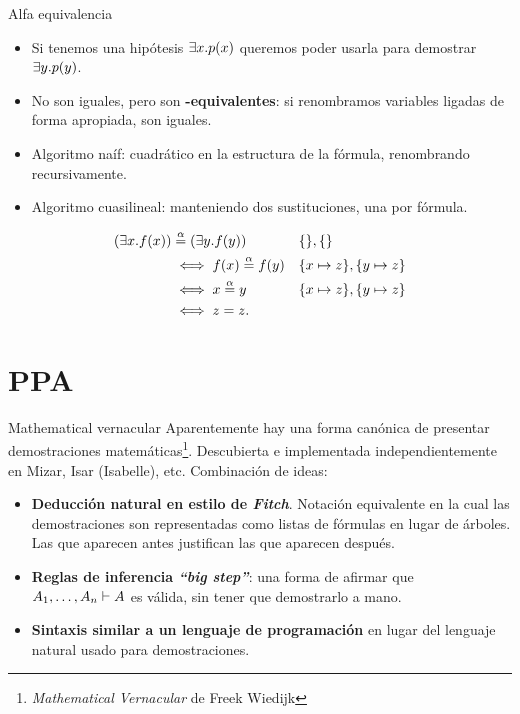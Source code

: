 \documentclass[xcolor={dvipsnames},spanish]{beamer}
\begin{document}
\begin{frame}{Alfa equivalencia}
    \begin{itemize}    
        \item Si tenemos una hipótesis $\exists x . p(x)$ queremos poder
        usarla para demostrar $\exists y . p(y)$.
        \item No son iguales, pero son \textbf{\bm{$\alpha$}-equivalentes}: si
        renombramos variables ligadas de forma apropiada, son iguales.
        \item Algoritmo naíf: cuadrático en la estructura de la fórmula,
        renombrando recursivamente.
        \item Algoritmo cuasilineal: manteniendo dos sustituciones, una por
        fórmula.
    \end{itemize}
    \begin{example}
        \begin{align*}
            (\exists x . f(x)) &\overset{\alpha}{=} (\exists y . f(y))
            &&\{\}, \{\}
            \\
            &\iff f(x) \overset{\alpha}{=} f(y)
                &&\{x \mapsto z\}, \{y \mapsto z\}\\
            &\iff x \overset{\alpha}{=} y
                &&\{x \mapsto z\}, \{y \mapsto z\}\\
            &\iff z = z.
        \end{align*}        
    \end{example}
\end{frame}

\section{PPA}

\begin{frame}{Mathematical vernacular}
    Aparentemente hay una forma canónica de presentar demostraciones matemáticas\footnote{\textit{Mathematical
    Vernacular} de Freek Wiedijk}. Descubierta e implementada independientemente en Mizar,
    Isar (Isabelle), etc. Combinación de ideas:

    \begin{itemize}
        \item \textbf{Deducción natural en estilo de \textit{Fitch}}. Notación
        equivalente en la cual las demostraciones son
        representadas como listas de fórmulas en lugar de árboles. Las que
        aparecen antes justifican las que aparecen después.
        \item \textbf{Reglas de inferencia \textit{``big step''}}: una forma de afirmar
        que $A_1, \dots, A_n \vdash A$ es válida, sin
        tener que demostrarlo a mano.
        \item \textbf{Sintaxis similar a un lenguaje de programación} en lugar del
        lenguaje natural usado para demostraciones.
    \end{itemize}
\end{frame}
\end{document}
